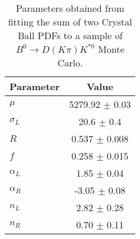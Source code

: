 \begin{table}[h]
  \centering
  \begin{tabular}{lc}
      \toprule
      Parameter & Value \\
      \midrule
      $\mu$ & 5279.92 $\pm$ 0.03 \\
      $\sigma_L$ & 20.6 $\pm$ 0.4 \\
      $R$ & 0.537 $\pm$ 0.008 \\
      $f$ & 0.258 $\pm$ 0.015 \\
      $\alpha_L$ & 1.85 $\pm$ 0.04 \\
      $\alpha_R$ & -3.05 $\pm$ 0.08 \\
      $n_L$ & 2.82 $\pm$ 0.28 \\
      $n_R$ & 0.70 $\pm$ 0.11 \\
  \bottomrule
  \end{tabular}
  \caption{Parameters obtained from fitting the sum of two Crystal Ball PDFs to a sample of $B^0 \to D(K\pi)K^{*0}$ Monte Carlo.}
\label{tab:signal_Kpi_MC_params}
\end{table}
